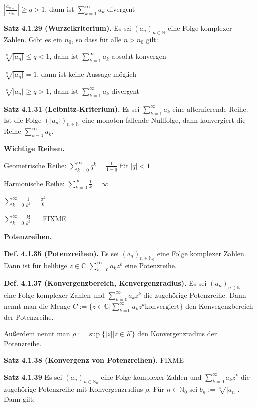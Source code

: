 $\left|\frac{a_{n+1}}{a_n}\right| \ge q > 1$, dann ist $\sum_{k=1}^\infty a_k$ divergent

\textbf{Satz 4.1.29 (Wurzelkriterium).} Es sei $(a_n)_{n\in \mathbb N}$ eine Folge komplexer Zahlen. Gibt es ein $n_0$, so dass für alle $n>n_0$ gilt:

$\sqrt[n]{\vert a_n \vert} \le q<1$, dann ist $\sum_{k=1}^\infty a_k$ absolut konvergen

$\sqrt[n]{\vert a_n \vert} = 1$, dann ist keine Aussage möglich

$\sqrt[n]{\vert a_n \vert} \ge q > 1$, dann ist $\sum_{k=1}^\infty a_k$ divergent

\textbf{Satz 4.1.31 (Leibnitz-Kriterium).} Es sei $\sum_{k=1}^\infty a_k$ eine alternierende Reihe. Ist die Folge $(\vert a_n \vert )_{n \in \mathbb N}$ eine monoton fallende Nullfolge, dann konvergiert die Reihe $\sum_{k=1}^\infty a_k$.

\textbf{Wichtige Reihen.}

Geometrische Reihe: $\sum_{k=0}^\infty q^k = \frac{1}{1-q}$ für $\vert q \vert < 1$

Harmonische Reihe: $\sum_{k=0}^\infty \frac{1}{k} = \infty$

$\sum_{k=0}^\infty \frac{1}{k^2} = \frac{\pi^2}{6}$

$\sum_{k=0}^\infty \frac{k!}{k^k} =$ FIXME

\textbf{Potenzreihen.}

\textbf{Def. 4.1.35 (Potenzreihen).} Es sei $(a_n)_{n \in \mathbb N_0}$ eine Folge komplexer Zahlen. Dann ist für belibige $z \in \mathbb C$ $\sum_{k=0}^\infty a_k z^k$ eine Potenzreihe.

\textbf{Def. 4.1.37 (Konvergenzbereich, Konvergenzradius).} Es sei $(a_n)_{n\in \mathbb N_0}$ eine Folge komplexer Zahlen und $\sum_{k=0}^\infty a_k z^k$ die zugehörige Potenzreihe. Dann nennt man die Menge $C := \{ z \in \mathbb C \vert \sum_{k=0}^\infty a_k z^k \text{konvergiert}\}$ den Konvegenzbereich der Potenzreihe.

Außerdem nennt man $\rho := \sup \{ \vert z\vert \vert z \in K\}$ den Konvergenzradius der Potenzreihe.

\textbf{Satz 4.1.38 (Konvergenz von Potenzreihen).} FIXME

\textbf{Satz 4.1.39} Es sei $(a_n)_{n \in \mathbb N_0}$ eine Folge komplexer Zahlen und $\sum_{k=0}^\infty a_k z^k$ die zugehörige Potenzreihe mit Konvergenzradius $\rho$. Für $n \in \mathbb N_0$ sei $b_n := \sqrt[n]{\vert a_n \vert}$. Dann gilt:

